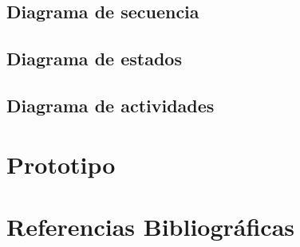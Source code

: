 \documentclass[12pt,twoside]{article}
\begin{document}
	
	\clearpage
	\subsection{Diagrama de secuencia}

	\subsection{Diagrama de estados}

	\subsection{Diagrama de actividades}

	\clearpage
	
	\section{Prototipo}

	\clearpage
	
	\section{Referencias Bibliográficas}
	
\end{document}
